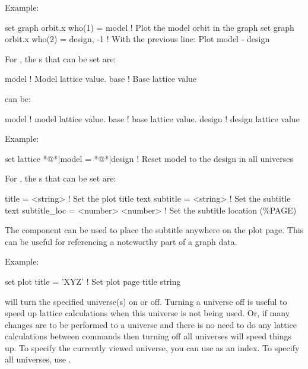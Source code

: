 {{{\begin{description}
Example:
\begin{example}
  set graph orbit.x who(1) = model      ! Plot the model orbit in the graph
  set graph orbit.x who(2) = design, -1 ! With the previous line: Plot model - design 
\end{example}


  \item[set lattice <component> = <value>] \Newline

For , the s that can be set are:
\begin{example}
  model      ! Model lattice value.
  base       ! Base lattice value
\end{example}
 can be:
\begin{example}
  model       ! model lattice value.
  base        ! base lattice value.
  design      ! design lattice value
\end{example}

Example:
\begin{example}
  set lattice *@*|model = *@*|design    ! Reset model to the design in all universes
\end{example}


  \item[set plot\_page <component> = <value1> \{<value2>\}] \Newline

For , the s that can be set are:
\begin{example}
  title        = <string>          ! Set the plot title text
  subtitle     = <string>          ! Set the subtitle text
  subtitle_loc = <number> <number> ! Set the subtitle location (\%PAGE)
\end{example}
The  component can be used to place the subtitle anywhere on
the plot page. This can be useful for referencing a noteworthy part of a graph
data.

Example:
\begin{example}
  set plot title = 'XYZ'  ! Set plot page title string
\end{example}


  \item[\protect\parbox{6in}{
        set universe <what\_universe> on/off \\ 
        set universe <what\_universe> recalculate}] \Newline
{} will turn the specified universe(s) on or
off. Turning a universe off is useful to speed up lattice calculations
when this universe is not being used. Or, if many changes are to be
performed to a universe and there is no need to do any lattice
calculations between commands then turning off all universes will
speed things up. To specify the currently viewed universe, you can use
 as an index.  To specify all universes, use 
\vn{*}.  


\end{description}}}}
